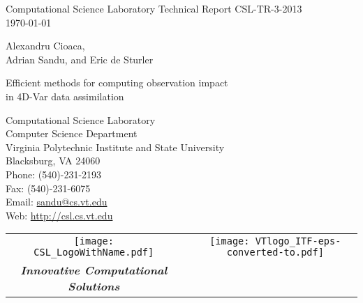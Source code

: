 \documentclass[final,sort&compress]{elsarticle}
\begin{document}
\clearpage{}\thispagestyle{empty}
\setcounter{page}{0}

\begin{Huge}
\begin{center}
Computational Science Laboratory Technical Report CSL-TR-3-2013 \\
\today
\end{center}
\end{Huge}
\vfil
\begin{huge}
\begin{center}
Alexandru Cioaca, \\ Adrian Sandu, and Eric de Sturler
\end{center}
\end{huge}

\vfil
\begin{huge}
\begin{it}
\begin{center}
Efficient methods for computing observation impact \\
in 4D-Var data assimilation
\end{center}
\end{it}
\end{huge}
\vfil


\begin{large}
\begin{center}
Computational Science Laboratory \\
Computer Science Department \\
Virginia Polytechnic Institute and State University \\
Blacksburg, VA 24060 \\
Phone: (540)-231-2193 \\
Fax: (540)-231-6075 \\ 
Email: \url{sandu@cs.vt.edu} \\
Web: \url{http://csl.cs.vt.edu}
\end{center}
\end{large}

\vspace*{1cm}


\begin{tabular}{ccc}
\texttt{[image: CSL\_LogoWithName.pdf]}
&\hspace{2.5in}&
\texttt{[image: VTlogo\_ITF-eps-converted-to.pdf]} \\
{\bf\em Innovative Computational Solutions} &&\\
\end{tabular}
\end{document}
